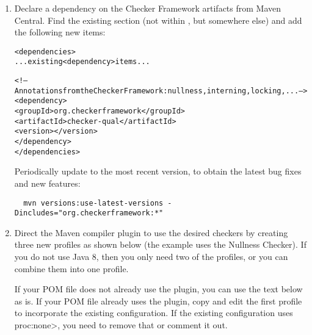 \begin{enumerate}

\item Declare a dependency on the Checker Framework artifacts from
  Maven Central.  Find the
  existing  section (not within
  , but somewhere else) and add the following new
   items:

\begin{alltt}
  <dependencies>
    ... existing <dependency> items ...

    <!-- Annotations from the Checker Framework: nullness, interning, locking, ... -->
    <dependency>
      <groupId>org.checkerframework</groupId>
      <artifactId>checker-qual</artifactId>
      <version>\ReleaseVersion{}</version>
    </dependency>
  </dependencies>
\end{alltt}

Periodically update to the most recent version, to obtain the
latest bug fixes and new features:
\begin{Verbatim}
  mvn versions:use-latest-versions -Dincludes="org.checkerframework:*"
\end{Verbatim}

\item Direct the Maven compiler plugin to use the desired checkers by
  creating three new profiles as shown below (the example uses the Nullness
  Checker).  If you do not use Java 8, then you only need two of the
  profiles, or you can combine them into one profile.

  If your POM file does not already use the
   plugin, you can use the text below as is.
  If your POM file
  already uses the plugin, copy and edit the first profile to incorporate the
  existing configuration.
  If the existing configuration uses \<proc:none>, you need to remove that
  or comment it out.



\end{enumerate}
